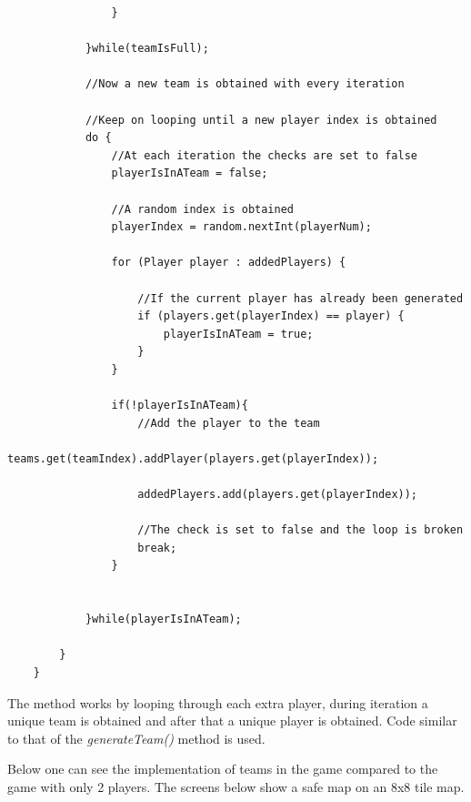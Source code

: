 \documentclass[a4paper,12pt]{extarticle}
\begin{document}
\begin{lstlisting}
                }

            }while(teamIsFull);

            //Now a new team is obtained with every iteration

            //Keep on looping until a new player index is obtained
            do {
                //At each iteration the checks are set to false
                playerIsInATeam = false;

                //A random index is obtained
                playerIndex = random.nextInt(playerNum);

                for (Player player : addedPlayers) {

                    //If the current player has already been generated
                    if (players.get(playerIndex) == player) {
                        playerIsInATeam = true;
                    }
                }

                if(!playerIsInATeam){
                    //Add the player to the team
                    teams.get(teamIndex).addPlayer(players.get(playerIndex));

                    addedPlayers.add(players.get(playerIndex));

                    //The check is set to false and the loop is broken
                    break;
                }


            }while(playerIsInATeam);

        }
    }
\end{lstlisting}

\noindent The method works by looping through each extra player, during iteration a unique team is obtained and after that a unique player is obtained. Code similar to that of the \textit{generateTeam()} method is used.

\noindent Below one can see the implementation of teams in the game compared to the game with only 2 players. The screens below show a safe map on an 8x8 tile map.
\end{document}
